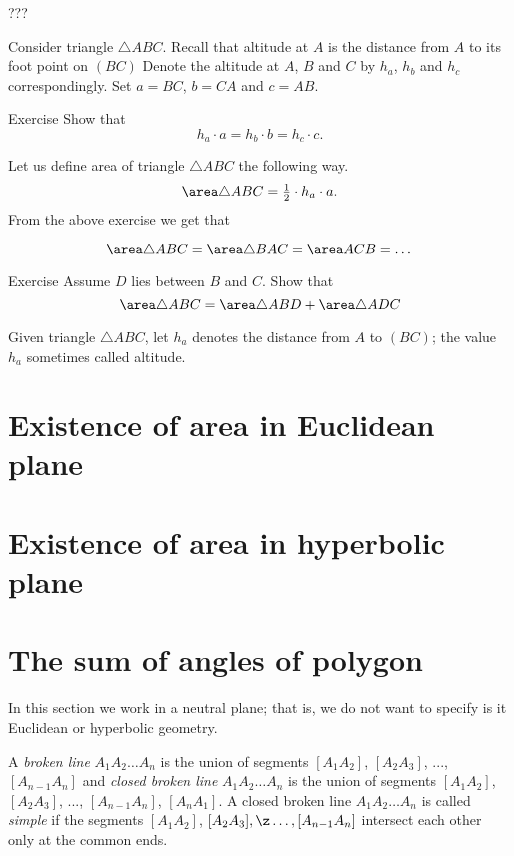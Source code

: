 {???

Consider triangle $\triangle ABC$.
Recall that altitude at $A$ is the distance from $A$ to its foot point on $(BC)$
Denote the altitude at $A$, $B$ and $C$ by $h_a$, $h_b$ and $h_c$ correspondingly.
Set $a=BC$, $b=CA$ and $c=AB$.

\begin{thm}{Exercise}
Show that 
$$h_a\cdot a=h_b\cdot b=h_c\cdot c.$$
\end{thm}


Let us define area of triangle $\triangle ABC$ the following way.
$$\area \triangle ABC= \tfrac12\cdot h_a\cdot a.
$$
From the above exercise we get that 

$$\area \triangle ABC=\area \triangle BAC=\area ACB=\dots$$


\begin{thm}{Exercise}
Assume $D$ lies between $B$ and $C$.
Show that 
$$\area \triangle ABC=\area \triangle ABD+\area \triangle ADC$$
\end{thm}

Given triangle $\triangle ABC$, let 
$h_a$ denotes the distance from $A$ to $(BC)$;
the value $h_a$ sometimes called altitude. 



\section*{Existence of area in Euclidean plane}

\section*{Existence of area in hyperbolic plane}




\section*{The sum of angles of polygon} 

In this section we work in a neutral plane;
that is, we do not want to specify is it Euclidean or hyperbolic geometry.

A \emph{broken line} $A_1A_2\dots A_n$
is the union of segments $[A_1A_2]$, $[A_2A_3]$, ..., $[A_{n-1}A_n]$
and  \emph{closed broken line} $A_1A_2\dots A_n$
is the union of segments $[A_1A_2]$, $[A_2A_3]$, ..., $[A_{n-1}A_n]$, $[A_nA_1]$.
A closed broken line  $A_1A_2\dots A_n$ is called \emph{simple} if the segments  $[A_1A_2]$, $[A_2A_3], \z\dots,[A_{n-1}A_n]$ intersect each other only at the common ends.

}
